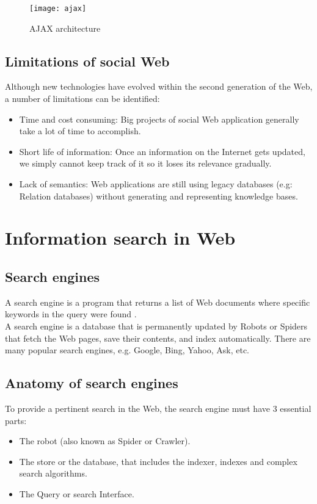 \begin{figure}[H]
\centering
\texttt{[image: ajax]}
\caption{AJAX architecture }
\label{fig_Ajax}
\end{figure}


\subsection{Limitations of social Web }

Although new technologies have evolved within the second generation of the Web, a number of limitations can be identified:

\begin{itemize}
    \item Time and cost consuming: Big projects of social Web application generally take a lot of time to accomplish. 
    \item Short life of information: Once an information on the Internet gets updated, we simply cannot keep track of it so it loses its relevance gradually.  
    \item Lack of semantics: Web applications are still using legacy databases (e.g: Relation databases) without generating and representing knowledge bases.
\end{itemize}


\section{Information search in Web}

\subsection{Search engines}

A search engine is a program that returns a list of Web documents where specific keywords in the query were found \cite{search}.\\
A search engine is a database that is permanently updated by Robots or Spiders that fetch the Web pages, save their contents, and index automatically. There are many popular search engines, e.g. Google, Bing, Yahoo, Ask, etc.


\subsection{Anatomy of search engines}
To provide a pertinent search in the Web, the search engine must have 3 essential parts:
\begin{itemize}
    \item The robot (also known as Spider or Crawler).
    \item The store or the database, that includes the indexer, indexes and complex search algorithms.
    \item The Query or search Interface.
\end{itemize}

